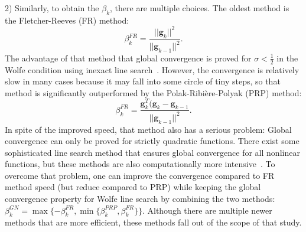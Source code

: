2) Similarly, to obtain the $\beta_k$, there are multiple choices. The oldest method is the Fletcher-Reeves (FR) method:
$$\beta_k^{FR} = \frac{||\mathbf{g}_k||^2}{||\mathbf{g}_{k-1}||^2}.$$
The advantage of that method that global convergence is proved for $\sigma < \frac{1}{2}$ in the Wolfe condition using inexact line search~\cite{Al-Baali}. However, the convergence is relatively slow in many cases because it may fall into some circle of tiny steps, so that method is significantly outperformed by the Polak-Ribi\`{e}re-Polyak (PRP) method:
$$\beta_k^{FR} = \frac{\mathbf{g}_k^T (\mathbf{g}_k - \mathbf{g}_{k-1}}{||\mathbf{g}_{k-1}||^2}.$$
In spite of the improved speed, that method also has a serious problem: Global convergence can only be proved for strictly quadratic functions. There exist some sophisticated line search method that ensures global convergence for all nonlinear functions, but these methods are also computationally more intensive~\cite{grippo}.
To overcome that problem, one can improve the convergence compared to FR method speed (but reduce compared to PRP) while keeping the global convergence property for Wolfe line search by combining the two methods: $\beta_k^{GN} = \max\{-\beta_k^{FR}, \min\{\beta_k^{PRP},\beta_k^{FR}\}\}.$
Although there are multiple newer methods that are more efficient, these methods fall out of the scope of that study.

